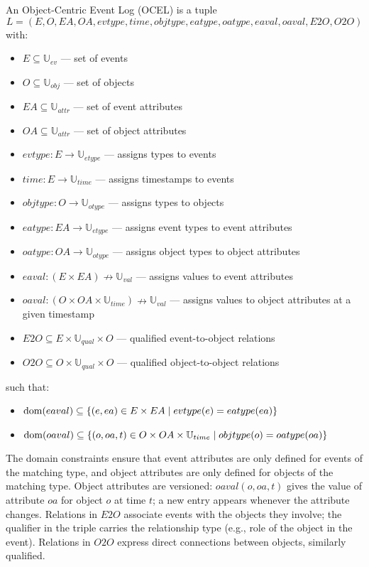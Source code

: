 An Object-Centric Event Log (OCEL) is a tuple
\[
L = (E, O, EA, OA, evtype, time, objtype, eatype, oatype, eaval, oaval, E2O, O2O)
\]
with:
\begin{itemize}
    \item $E \subseteq \mathbb{U}_{ev}$ --- set of events
    \item $O \subseteq \mathbb{U}_{obj}$ --- set of objects
    \item $EA \subseteq \mathbb{U}_{attr}$ --- set of event attributes
    \item $OA \subseteq \mathbb{U}_{attr}$ --- set of object attributes
    \item $evtype : E \to \mathbb{U}_{etype}$ --- assigns types to events
    \item $time : E \to \mathbb{U}_{time}$ --- assigns timestamps to events
    \item $objtype : O \to \mathbb{U}_{otype}$ --- assigns types to objects
    \item $eatype : EA \to \mathbb{U}_{etype}$ --- assigns event types to event attributes
    \item $oatype : OA \to \mathbb{U}_{otype}$ --- assigns object types to object attributes
    \item $eaval : (E \times EA) \nrightarrow \mathbb{U}_{val}$ --- assigns values to event attributes
    \item $oaval : (O \times OA \times \mathbb{U}_{time}) \nrightarrow \mathbb{U}_{val}$ --- assigns values to object attributes at a given timestamp
    \item $E2O \subseteq E \times \mathbb{U}_{qual} \times O$ --- qualified event-to-object relations
    \item $O2O \subseteq O \times \mathbb{U}_{qual} \times O$ --- qualified object-to-object relations
\end{itemize}

such that:
\begin{itemize}
    \item $\operatorname*{dom}(eaval) \subseteq \{ (e, ea) \in E \times EA \mid evtype(e) = eatype(ea) \}$
    \item $\operatorname*{dom}(oaval) \subseteq \{ (o, oa, t) \in O \times OA \times \mathbb{U}_{time} \mid objtype(o) = oatype(oa) \}$
\end{itemize}

The domain constraints ensure that event attributes are only defined for events of the matching type, and object attributes are only defined for objects of the matching type. Object attributes are versioned: $oaval(o, oa, t)$ gives the value of attribute $oa$ for object $o$ at time $t$; a new entry appears whenever the attribute changes. Relations in $E2O$ associate events with the objects they involve; the qualifier in the triple carries the relationship type (e.g., role of the object in the event). Relations in $O2O$ express direct connections between objects, similarly qualified.

